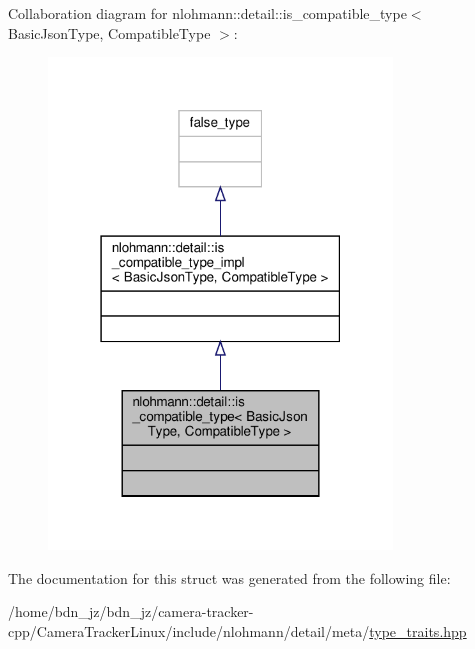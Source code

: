 Collaboration diagram for nlohmann\+:\+:detail\+:\+:is\+\_\+compatible\+\_\+type$<$ Basic\+Json\+Type, Compatible\+Type $>$\+:\nopagebreak
\begin{figure}[H]
\begin{center}
\leavevmode
\includegraphics[width=259pt]{structnlohmann_1_1detail_1_1is__compatible__type__coll__graph}
\end{center}
\end{figure}


The documentation for this struct was generated from the following file\+:\begin{DoxyCompactItemize}
\item 
/home/bdn\+\_\+jz/bdn\+\_\+jz/camera-\/tracker-\/cpp/\+Camera\+Tracker\+Linux/include/nlohmann/detail/meta/\hyperlink{type__traits_8hpp}{type\+\_\+traits.\+hpp}\end{DoxyCompactItemize}
